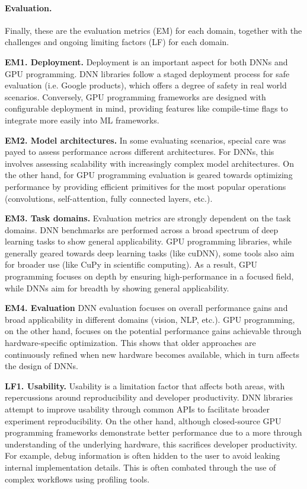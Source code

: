 \paragraph{Evaluation.}
Finally, these are the evaluation metrics (EM) for each domain, together with the challenges and
ongoing limiting factors (LF) for each domain.

\textbf{EM1. Deployment.}
Deployment is an important aspect for both DNNs and GPU programming. DNN libraries follow a staged
deployment process for safe evaluation (i.e. Google products), which offers a degree of safety in
real world scenarios. Conversely, GPU programming frameworks are designed with configurable deployment
in mind, providing features like compile-time flags to integrate more easily into ML frameworks.

\textbf{EM2. Model architectures.}
In some evaluating scenarios, special care was payed to assess performance across different architectures.
For DNNs, this involves assessing scalability with increasingly complex model architectures. On the other hand,
for GPU programming evaluation is geared towards optimizing performance by providing efficient primitives
for the most popular operations (convolutions, self-attention, fully connected layers, etc.).

\textbf{EM3. Task domains.}
Evaluation metrics are strongly dependent on the task domains. DNN benchmarks are performed across
a broad spectrum of deep learning tasks to show general applicability. GPU programming libraries,
while generally geared towards deep learning tasks (like cuDNN), some tools also aim for broader
use (like CuPy in scientific computing). As a result, GPU programming focuses on depth by ensuring
high-performance in a focused field, while DNNs aim for breadth by showing general applicability.





\textbf{EM4. Evaluation}
DNN evaluation focuses on overall performance gains and broad applicability in different domains (vision,
NLP, etc.). GPU programming, on the other hand, focuses on the potential performance gains achievable through
hardware-specific optimization. This shows that older approaches are continuously refined when new hardware
becomes available, which in turn affects the design of DNNs.

\textbf{LF1. Usability.}
Usability is a limitation factor that affects both areas, with repercussions around reproducibility and developer
productivity. DNN libraries attempt to improve usability through common APIs to facilitate broader
experiment reproducibility. On the other hand, although closed-source GPU programming frameworks
demonstrate better performance due to a more through understanding of the underlying hardware, this sacrifices
developer productivity. For example, debug information is often hidden to the user to avoid leaking
internal implementation details. This is often combated through the use of complex workflows using
profiling tools.


